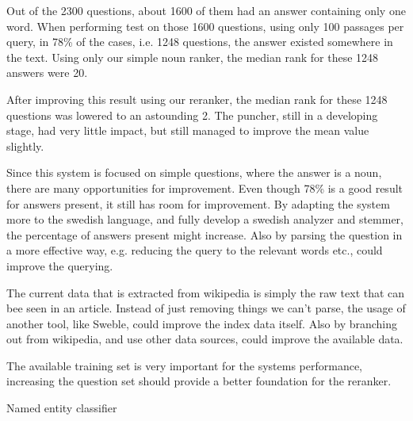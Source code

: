 Out of the 2300 questions, about 1600 of them had an answer containing only one word.
When performing test on those 1600 questions, using only 100 passages per query, 
in 78\% of the cases, i.e. 1248 questions, the answer existed somewhere in the text.
Using only our simple noun ranker, the median rank for these 1248 answers were 20.

After improving this result using our reranker, the median rank for these 1248 questions was lowered to an astounding 2.
The puncher, still in a developing stage, had very little impact, but still managed to improve the mean value slightly.

Since this system is focused on simple questions, where the answer is a noun, there are many opportunities for improvement.
Even though 78\% is a good result for answers present, it still has room for improvement. By adapting the system more to the swedish language, 
and fully develop a swedish analyzer and stemmer, the percentage of answers present might increase.
Also by parsing the question in a more effective way, e.g. reducing the query to the relevant words etc., could improve the querying.

The current data that is extracted from wikipedia is simply the raw text that can bee seen in an article. 
Instead of just removing things we can't parse, the usage of another tool, like Sweble, could improve the index data itself.
Also by branching out from wikipedia, and use other data sources, could improve the available data.

The available training set is very important for the systems performance, increasing the question set should provide a better foundation for the reranker.

Named entity classifier


